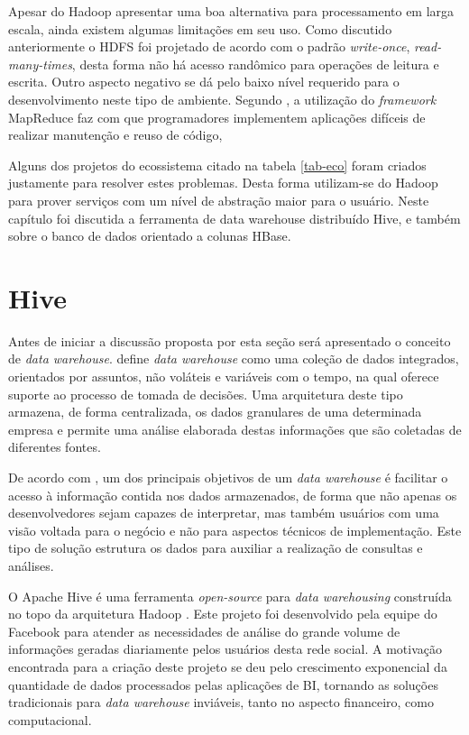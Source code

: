 Apesar do Hadoop apresentar uma boa alternativa para processamento em larga escala, ainda existem algumas limitações em seu uso. Como discutido anteriormente o HDFS foi projetado de acordo com o padrão \textit{write-once}, \textit{read-many-times}, desta forma não há acesso randômico para operações de leitura e escrita. Outro aspecto negativo se dá pelo baixo nível requerido para o desenvolvimento neste tipo de ambiente. Segundo , a utilização do \textit{framework} MapReduce faz com que programadores implementem aplicações difíceis de realizar manutenção e reuso de código,

Alguns dos projetos do ecossistema citado na tabela \ref{tab-eco} foram criados justamente para resolver estes problemas. Desta forma utilizam-se do Hadoop para prover serviços com um nível de abstração maior para o usuário. Neste capítulo foi discutida a ferramenta de data warehouse distribuído Hive, e também sobre o banco de dados orientado a colunas HBase.

\section{Hive}

Antes de iniciar a discussão proposta por esta seção será apresentado o conceito de \textit{data warehouse}.  define \textit{data warehouse} como uma coleção de dados integrados, orientados por assuntos, não voláteis e variáveis com o tempo, na qual oferece suporte ao processo de tomada de decisões. Uma arquitetura deste tipo armazena, de forma centralizada, os dados granulares de uma determinada empresa e permite uma análise elaborada destas informações que são coletadas de diferentes fontes.

De acordo com , um dos principais objetivos de um \textit{data warehouse} é facilitar o acesso à informação contida nos dados armazenados, de forma que não apenas os desenvolvedores sejam capazes de interpretar, mas também usuários com uma visão voltada para o negócio e não para aspectos técnicos de implementação. Este tipo de solução estrutura os dados para auxiliar a realização de consultas e análises.

O Apache Hive é uma ferramenta \textit{open-source} para \textit{data warehousing} construída no topo da arquitetura  Hadoop \cite{thusoo2009}. Este projeto foi desenvolvido pela equipe do Facebook para atender as necessidades de análise do grande volume de informações geradas diariamente pelos usuários desta rede social. A motivação encontrada para a criação deste projeto se deu pelo crescimento exponencial da quantidade de dados processados pelas aplicações de BI, tornando as soluções tradicionais para \textit{data warehouse} inviáveis, tanto no aspecto financeiro, como computacional.


